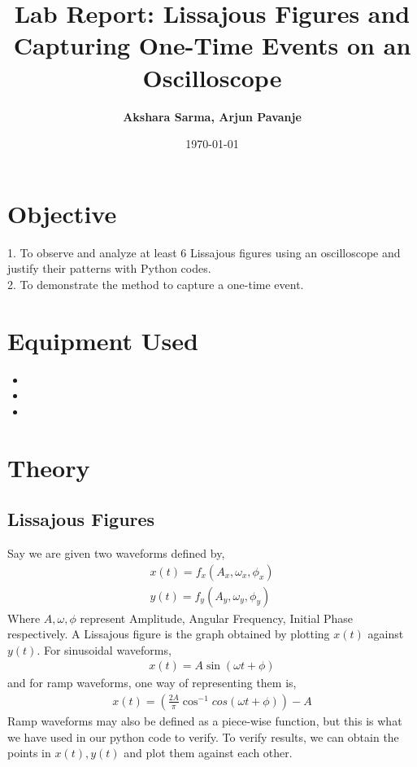 \documentclass[a4paper,12pt]{article}
\title{Lab Report: Lissajous Figures and Capturing One-Time Events on an Oscilloscope}
\author{\textbf{Akshara Sarma, Arjun Pavanje}}
\date{\today}
\begin{document}
\maketitle

\section*{Objective}
1. To observe and analyze at least 6 Lissajous figures using an oscilloscope and justify their patterns with Python codes.\\
2. To demonstrate the method to capture a one-time event.\\

\section*{Equipment Used}
\begin{itemize}
\item {}
    \item {}
    \item {}
\end{itemize}
\section*{Theory}
\subsection*{Lissajous Figures}
Say we are given two waveforms defined by,
\begin{align*}
  x(t) = f_x(A_x, \omega _x, \phi _x)\\
  y(t) = f_y(A_y, \omega _y, \phi_y)
\end{align*}
Where $A, \omega, \phi$ represent Amplitude, Angular Frequency, Initial Phase respectively. A Lissajous figure is the graph obtained by plotting $x(t)$ against $y(t)$. \newline
For sinusoidal waveforms, 
\begin{align*}
  x(t) = A \sin (\omega t + \phi)
\end{align*}
and for ramp waveforms, one way of representing them is, 
\begin{align*}
  x(t) = (\frac{2A}{\pi} \cos^{-1}cos(\omega t + \phi)) - A
  \end{align*}
  Ramp waveforms may also be defined as a piece-wise function, but this is what we have used in our python code to verify. To verify results, we can obtain the points in $x(t), y(t)$ and plot them against each other.
\end{document}

